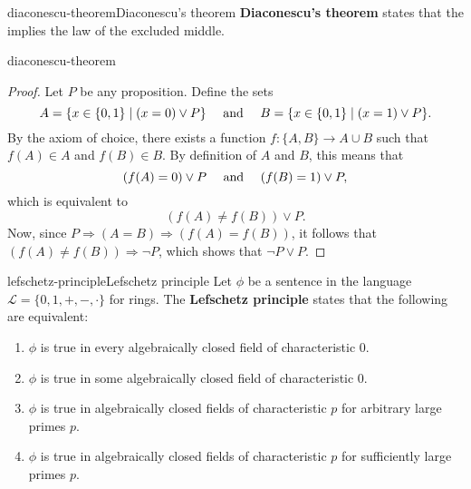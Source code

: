 \begin{topic}{diaconescu-theorem}{Diaconescu's theorem}
    \textbf{Diaconescu's theorem} states that the  implies the law of the excluded middle.
\end{topic}

\begin{example}{diaconescu-theorem}
    \begin{proof}
        Let $P$ be any proposition. Define the sets
        \[ A = \{ x \in \{ 0, 1 \} \mid (x = 0) \lor P \} \quad \textup{ and } \quad B = \{ x \in \{ 0, 1 \} \mid (x = 1) \lor P \} . \]
        By the axiom of choice, there exists a function $f \colon \{ A, B \} \to A \cup B$ such that $f(A) \in A$ and $f(B) \in B$. By definition of $A$ and $B$, this means that
        \[ (f(A) = 0) \lor P \quad \textup{ and } \quad (f(B) = 1) \lor P , \]
        which is equivalent to
        \[ (f(A) \ne f(B)) \lor P . \]
        Now, since $P \Rightarrow (A = B) \Rightarrow (f(A) = f(B))$, it follows that $(f(A) \ne f(B)) \Rightarrow \neg P$, which shows that $\neg P \lor P$.
    \end{proof}
\end{example}

\begin{topic}{lefschetz-principle}{Lefschetz principle}
    Let $\phi$ be a sentence in the language $\mathcal{L} = \{ 0, 1, +, -, \cdot \}$ for rings. The \textbf{Lefschetz principle} states that the following are equivalent:
    \begin{enumerate}[label=(\roman*)]
        \item $\phi$ is true in every algebraically closed field of characteristic $0$.
        \item $\phi$ is true in some algebraically closed field of characteristic $0$.
        \item $\phi$ is true in algebraically closed fields of characteristic $p$ for arbitrary large primes $p$.
        \item $\phi$ is true in algebraically closed fields of characteristic $p$ for sufficiently large primes $p$.
    \end{enumerate}
\end{topic}
